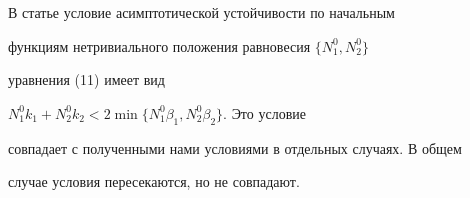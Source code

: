 \begin{note}


В статье \cite{17} условие асимптотической устойчивости по начальным


функциям нетривиального положения равновесия $\{N_1^0,N_2^0\}$


уравнения (11) имеет вид


$N_1^0k_1+N_2^0k_2<2\min\{N_1^0\beta_1,N_2^0\beta_2\}$. Это условие


совпадает с полученными нами условиями в отдельных случаях. В общем


случае условия пересекаются, но не совпадают.


\end{note}








